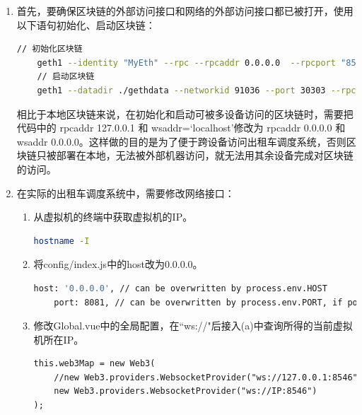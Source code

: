 \begin{enumerate}
    \item 首先，要确保区块链的外部访问接口和网络的外部访问接口都已被打开，使用以下语句初始化、启动区块链：
\begin{lstlisting}[language=bash, caption={初始化、启动区块链}, label={lst:initBlockChain}]
    // 初始化区块链
    geth1 --identity "MyEth" --rpc --rpcaddr 0.0.0.0  --rpcport "8545" --rpccorsdomain "*" --datadir gethdata --port "30303" --nodiscover --rpcapi "eth,net,personal,web3" --networkid 91036 init genesis.json
    // 启动区块链
    geth1 --datadir ./gethdata --networkid 91036 --port 30303 --rpc --rpcaddr 0.0.0.0 --rpcport 8545 --rpcapi 'personal,net,eth,web3,admin' --rpccorsdomain='*' --ws --wsaddr 0.0.0.0 --wsport 8546 --wsorigins='*' --wsapi 'personal,net,eth,web3,admin' --nodiscover --allow-insecure-unlock --dev.period 1 --syncmode='full' console\end{lstlisting}
    相比于本地区块链来说，在初始化和启动可被多设备访问的区块链时，需要把代码中的 rpcaddr 127.0.0.1 和 wsaddr=`localhost'修改为 rpcaddr 0.0.0.0 和 wsaddr 0.0.0.0。这样做的目的是为了便于跨设备访问出租车调度系统，否则区块链只被部署在本地，无法被外部机器访问，就无法用其余设备完成对区块链的访问。
    
    \item 在实际的出租车调度系统中，需要修改网络接口：
    \begin{enumerate}
        \item 从虚拟机的终端中获取虚拟机的IP。
\begin{lstlisting}[language=bash, caption={获取虚拟机IP}, label={lst:getIP}]
    hostname -I\end{lstlisting}
        \item 将config/index.js中的host改为0.0.0.0。
\begin{lstlisting}[language=bash, caption={修改config/index.js}, label={lst:fixindex}]
    host: '0.0.0.0', // can be overwritten by process.env.HOST
    port: 8081, // can be overwritten by process.env.PORT, if port is in use, a free one will be determined\end{lstlisting}
        \item 修改Global.vue中的全局配置，在``ws://"后接入(a)中查询所得的当前虚拟机所在IP。
        \begin{lstlisting}[language=html, caption={修改Global.vue}, label={lst:changeIP}]
this.web3Map = new Web3(
    //new Web3.providers.WebsocketProvider("ws://127.0.0.1:8546")
    new Web3.providers.WebsocketProvider("ws://IP:8546")
);\end{lstlisting}
    \end{enumerate}
\end{enumerate}

